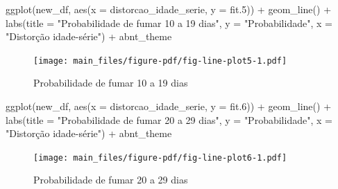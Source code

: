 \documentclass[
]{article}
\newenvironment{Shaded}{\begin{snugshade}}{\end{snugshade}}
\newcommand{\AttributeTok}[1]{\textcolor[rgb]{0.40,0.45,0.13}{#1}}
\newcommand{\FloatTok}[1]{\textcolor[rgb]{0.68,0.00,0.00}{#1}}
\newcommand{\FunctionTok}[1]{\textcolor[rgb]{0.28,0.35,0.67}{#1}}
\newcommand{\NormalTok}[1]{\textcolor[rgb]{0.00,0.23,0.31}{#1}}
\newcommand{\SpecialCharTok}[1]{\textcolor[rgb]{0.37,0.37,0.37}{#1}}
\newcommand{\StringTok}[1]{\textcolor[rgb]{0.13,0.47,0.30}{#1}}
\begin{document}
\begin{Shaded}
\begin{Highlighting}[]
\FunctionTok{ggplot}\NormalTok{(new\_df, }\FunctionTok{aes}\NormalTok{(}\AttributeTok{x =}\NormalTok{ distorcao\_idade\_serie, }\AttributeTok{y =}\NormalTok{ fit}\FloatTok{.5}\NormalTok{)) }\SpecialCharTok{+} \FunctionTok{geom\_line}\NormalTok{() }\SpecialCharTok{+} \FunctionTok{labs}\NormalTok{(}\AttributeTok{title =} \StringTok{"Probabilidade de fumar 10 a 19 dias"}\NormalTok{, }\AttributeTok{y =} \StringTok{"Probabilidade"}\NormalTok{, }\AttributeTok{x =} \StringTok{"Distorção idade{-}série"}\NormalTok{) }\SpecialCharTok{+}\NormalTok{ abnt\_theme}
\end{Highlighting}
\end{Shaded}

\begin{figure}[H]

{\centering \texttt{[image: main\_files/figure-pdf/fig-line-plot5-1.pdf]}

}

\caption{\label{fig-line-plot5}Probabilidade de fumar 10 a 19 dias}

\end{figure}

\begin{Shaded}
\begin{Highlighting}[]
\FunctionTok{ggplot}\NormalTok{(new\_df, }\FunctionTok{aes}\NormalTok{(}\AttributeTok{x =}\NormalTok{ distorcao\_idade\_serie, }\AttributeTok{y =}\NormalTok{ fit}\FloatTok{.6}\NormalTok{)) }\SpecialCharTok{+} \FunctionTok{geom\_line}\NormalTok{() }\SpecialCharTok{+} \FunctionTok{labs}\NormalTok{(}\AttributeTok{title =} \StringTok{"Probabilidade de fumar 20 a 29 dias"}\NormalTok{, }\AttributeTok{y =} \StringTok{"Probabilidade"}\NormalTok{, }\AttributeTok{x =} \StringTok{"Distorção idade{-}série"}\NormalTok{) }\SpecialCharTok{+}\NormalTok{ abnt\_theme}
\end{Highlighting}
\end{Shaded}

\begin{figure}[H]

{\centering \texttt{[image: main\_files/figure-pdf/fig-line-plot6-1.pdf]}

}

\caption{\label{fig-line-plot6}Probabilidade de fumar 20 a 29 dias}

\end{figure}
\end{document}
